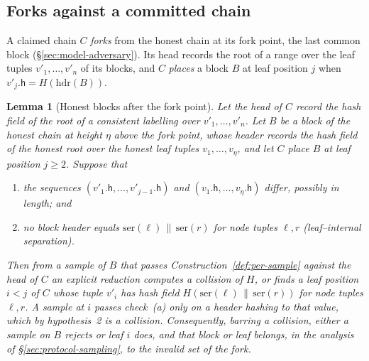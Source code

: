 \documentclass[11pt,a4paper]{article}
\newtheorem{lemma}[theorem]{Lemma}
\theoremstyle{definition}
\begin{document}
\subsection{Forks against a committed chain}\label{sec:protocol-forks}

A claimed chain $C$ \emph{forks} from the honest chain at its fork point, the
last common block (\S\ref{sec:model-adversary}). Its head records the root
of a range over the leaf tuples $v'_1,\dots,v'_n$ of its blocks, and $C$
\emph{places} a block $B$ at leaf position $j$ when
$v'_j.\mathsf{h}=H(\mathrm{hdr}(B))$.

\begin{lemma}[Honest blocks after the fork point]\label{lem:no-honest}
Let the head of $C$ record the hash field of the root of a consistent
labelling over $v'_1,\dots,v'_n$. Let $B$ be a block of the honest chain at
height $\eta$ above the fork point, whose header records the hash field of
the honest root over the honest leaf tuples $v_1,\dots,v_\eta$, and let $C$
place $B$ at leaf position $j\ge 2$. Suppose that
\begin{enumerate}
\item the sequences $(v'_1.\mathsf{h},\dots,v'_{j-1}.\mathsf{h})$ and
  $(v_1.\mathsf{h},\dots,v_\eta.\mathsf{h})$ differ, possibly in length; and
\item no block header equals $\mathrm{ser}(\ell)\,\|\,\mathrm{ser}(r)$ for
  node tuples $\ell,r$ (leaf--internal separation).
\end{enumerate}
Then from a sample of $B$ that passes Construction~\ref{def:per-sample}
against the head of $C$ an explicit reduction computes a collision of $H$,
or finds a leaf position $i<j$ of $C$ whose tuple $v'_i$ has hash field
$H(\mathrm{ser}(\ell)\,\|\,\mathrm{ser}(r))$ for node tuples $\ell,r$. A
sample at $i$ passes check~(a) only on a header hashing to that value, which
by hypothesis~2 is a collision. Consequently, barring a collision, either a
sample on $B$ rejects or leaf $i$ does, and that block or leaf belongs, in
the analysis of \S\ref{sec:protocol-sampling}, to the invalid set of the
fork.
\end{lemma}
\end{document}
